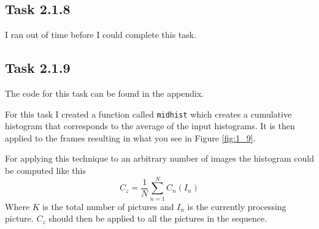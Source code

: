 \subsection{Task 2.1.8}
I ran out of time before I could complete this task.

\subsection{Task 2.1.9}
The code for this task can be found in the appendix.

For this task I created a function called \texttt{midhist} which creates a
cumulative histogram that corresponds to the average of the input histograms. It
is then applied to the frames resulting in what you see in Figure \ref{fig:1_9}.

For applying this technique to an arbitrary number of images the histogram could
be computed like this
\[
    C_z = \frac{1}{N}\sum^N_{n=1} C_n(I_n)
\]
Where $K$ is the total number of pictures and $I_n$ is the currently processing
picture. $C_z$ should then be applied to all the pictures in the sequence.
